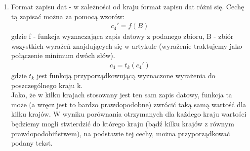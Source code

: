 \documentclass{classrep}
\newtheorem{exmp}{Przykład}[section]
\begin{document}
\begin{enumerate}
\begin{exmp}
    . \\
    \end{exmp}W przytoczonym fragmencie zapis daty został wykorzystany 3 razy ("October 1", "1987/88", "June 1"). Wobec tego, uważamy, że opisywana cecha będzie korzystnie wpływać na proces klasyfikacji tekstów. \\

    \item Format zapisu dat - w zależności od kraju format zapisu dat różni się. Cechę tą zapisać można za pomocą wzorów:
    \begin{gather}
        c_4' = f(B)
    \end{gather}
    \indent gdzie f - funkcja wyznaczająca zapis datowy z podanego zbioru, B - zbiór wszystkich wyrażeń znajdujących się w artykule (wyrażenie traktujemy jako połączenie minimum dwóch słów).
    \begin{gather}
        c_4 = t_k(c_4')
    \end{gather}
    \indent gdzie $t_k$ jest funkcją przyporządkowującą wyznaczone wyrażenia do poszczególnego kraju k.\\
    Jako, że w kilku krajach stosowany jest ten sam zapis datowy, funkcja ta może (a wręcz jest to bardzo prawdopodobne) zwrócić taką samą wartość dla kilku krajów. W wyniku porównania otrzymanych dla każdego kraju wartości będziemy mogli stwierdzić do którego kraju (bądź kilku krajów z równym prawdopodobiństwem), na podstawie tej cechy, można przyporządkować podany tekst. 
    \\
    

\end{enumerate}
\end{document}
